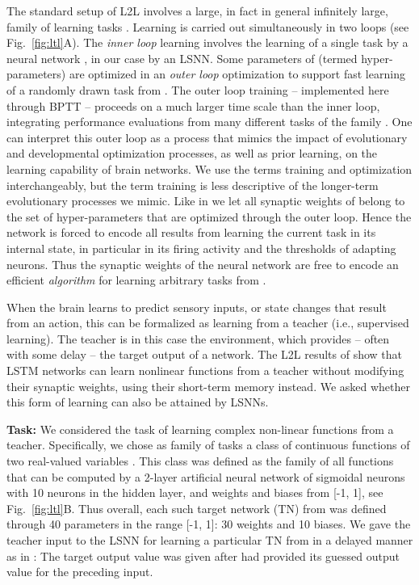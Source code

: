 \documentclass{article} \pdfoutput=1
\begin{document}
The standard setup of L2L involves a large, in fact in general infinitely large, family  of learning tasks .
Learning is carried out simultaneously in two loops (see Fig.~\ref{fig:ltl}A).
The {\em inner loop} learning involves the learning of a single task  by a neural network , in our case by an LSNN. Some parameters of  (termed hyper-parameters) are optimized in an {\em outer loop} optimization to support fast learning of a randomly drawn task  from .
The outer loop training -- implemented here through BPTT -- proceeds on a much larger time scale than the inner loop, integrating performance evaluations from many different tasks  of the family .  
One can interpret this outer loop as a process that mimics the impact of evolutionary and developmental optimization processes, as well as prior learning, on the learning capability of brain networks. 
We use the terms training and optimization interchangeably, but the term training is less descriptive of the longer-term evolutionary processes we mimic.
Like in \cite{hochreiter2001learning,wang2016learning,duan2016rl} we let all synaptic weights of  belong to the set of hyper-parameters that are optimized through the outer loop.
Hence the network is forced to encode all results from learning the current task  in its internal state, in particular in its firing activity and the thresholds of adapting neurons.
Thus the synaptic weights of the neural network  are free to encode an efficient \textit{algorithm} for learning arbitrary tasks  from . 

When the brain learns to predict sensory inputs, or state changes that result from an action, this can be formalized as learning from a teacher (i.e., supervised learning).
The teacher is in this case the environment, which provides -- often with some delay -- the target output of a network.
The L2L results of \cite{hochreiter2001learning} show that LSTM networks can learn nonlinear functions from a teacher without modifying their synaptic weights, using their short-term memory instead.
We asked whether this form of learning can also be attained by LSNNs.

\textbf{Task:}
We considered the task of learning complex non-linear functions from a teacher. 
Specifically, we chose as family  of tasks a class of continuous functions of two real-valued variables . This class was defined as the family of all functions that can be computed by a 2-layer artificial neural network of sigmoidal neurons with 10 neurons in the hidden layer, and weights and biases from [-1, 1], see Fig.~\ref{fig:ltl}B.
Thus overall, each such target network (TN) from  was defined through 40 parameters in the range [-1, 1]: 30 weights and 10 biases. 
We gave the teacher input to the LSNN for learning a particular TN  from  in a delayed manner as in \cite{hochreiter2001learning}: The target output value was given after  had provided its guessed output value for the preceding input.
\end{document}
